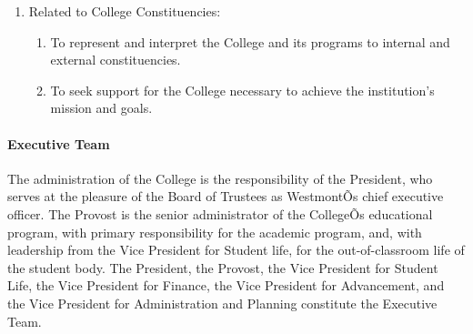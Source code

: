 \documentclass[letterpaper, 11pt]{article}
\begin{document}
\begin{enumerate}[label=\alph*)]
{\begin{enumerate}[label=\alph*)]
{\begin{enumerate}[label=\arabic*)]
{\begin{enumerate}[label=\alph*)]
										\item{To provide vision and leadership for the faculty and administration in formulating educational and support programs.}
										\item{To oversee the operation and development of the institution as a whole.}
										\item{To supervise the Vice Presidents in the performance of their duties.}
										\item{To make final review and give final administrative approval of College plans, budgets, and policies and to submit appropriate items to the Board of Trustees for adoption.}
									\end{enumerate}
								}
								\item{Related to College Constituencies:
									\begin{enumerate}[label=\alph*)]
										\item{To represent and interpret the College and its programs to internal and external constituencies.}
										\item{To seek support for the College necessary to achieve the institution's mission and goals.}
									\end{enumerate}
								}
							\end{enumerate}
						}
					\end{enumerate}
					}
			\end{enumerate}
			\paragraph{Executive Team}

				The administration of the College is the responsibility of the President, who serves at the pleasure of the Board of Trustees as WestmontÕs chief executive officer.  The Provost is the senior administrator of the CollegeÕs educational program, with primary responsibility for the academic program, and, with leadership from the Vice President for Student life, for the out-of-classroom life of the student body.  The President, the Provost, the Vice President for Student Life, the Vice President for Finance, the Vice President for Advancement, and the Vice President for Administration and Planning constitute the Executive Team.
\end{document}
